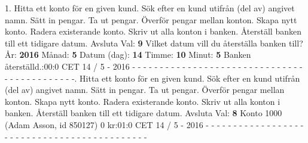 1.   Hitta ett konto för en given kund.   Sök efter en kund utifrån (del av) angivet namn.   Sätt in pengar.   Ta ut pengar.   Överför pengar mellan konton.   Skapa nytt konto.   Radera existerande konto.   Skriv ut alla konton i banken.   Återställ banken till ett tidigare datum. Avsluta\newline
Val: \textbf{9}\newline
Vilket datum vill du återställa banken till?\newline
År: \textbf{2016}\newline
Månad: \textbf{5}\newline
Datum (dag): \textbf{14}\newline
Timme: \textbf{10}\newline
Minut: \textbf{5}\newline
Banken återställd.:00:0 CET 14 / 5 - 2016\newline
- - - - - - - - - - - - - - - - - - - - - - - - - - - - - - - - - - - - - - - - - - - -.   Hitta ett konto för en given kund.   Sök efter en kund utifrån (del av) angivet namn.   Sätt in pengar.   Ta ut pengar.   Överför pengar mellan konton.   Skapa nytt konto.   Radera existerande konto.   Skriv ut alla konton i banken.   Återställ banken till ett tidigare datum. Avsluta\newline
Val: \textbf{8}\newline
Konto 1000 (Adam Asson, id 850127) 0 kr:01:0 CET 14 / 5 - 2016\newline
- - - - - - - - - - - - - - - - - - - - - - - - - - - - - - - - - - - - - - - - - - - -\newline
